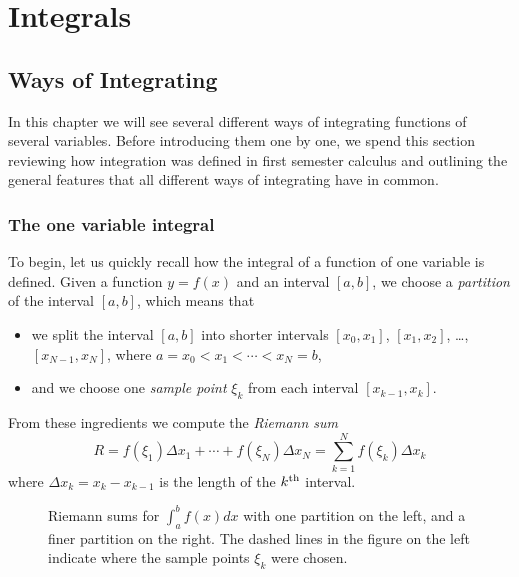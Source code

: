 \chapter{Integrals} 
%
\section{Ways of Integrating}
In this chapter we will see several different ways of integrating functions of
several variables.  Before introducing them one by one, we spend this section
reviewing how integration was defined in first semester calculus and outlining
the general features that all different ways of integrating have in common.

\subsection{The one variable integral}
To begin, let us quickly recall how the integral of a function of one variable
is defined.  Given a function $y=f(x)$ and an interval $[a,b]$, we choose a
\emph{partition} of the interval $[a,b]$, which means that
\begin{itemize}
\item we split the interval $[a,b]$ into shorter intervals $[x_0, x_1]$, $[x_1,
  x_2]$, \ldots, $[x_{N-1}, x_N]$, where $a=x_0<x_1<\cdots<x_N=b$,
\item and we choose one \emph{sample point} $\xi_k$ from each interval
  $[x_{k-1}, x_k]$.
\end{itemize}
From these ingredients we compute the \emph{Riemann sum}
\[
R = f(\xi_1) \Delta x_1 + \cdots + f(\xi_N)\Delta x_N = \sum_{k=1}^N f(\xi_k)
\Delta x_k
\]
where $\Delta x_k = x_k - x_{k-1}$ is the length of the $k^{\rm th}$ interval.
\begin{figure}[ht]\noindent
  \begin{minipage}[t]{0.4\textwidth}
    
  \end{minipage}\hspace{3em}
  \begin{minipage}[t]{0.4\textwidth}
    
  \end{minipage}
  \caption{Riemann sums for $\int_a^b f(x) dx$ with one partition on the left,
    and a finer partition on the right.  The dashed lines in the figure on the
    left indicate where the sample points $\xi_k$ were chosen.}
  \label{fig:04Riemann1D}
\end{figure}

